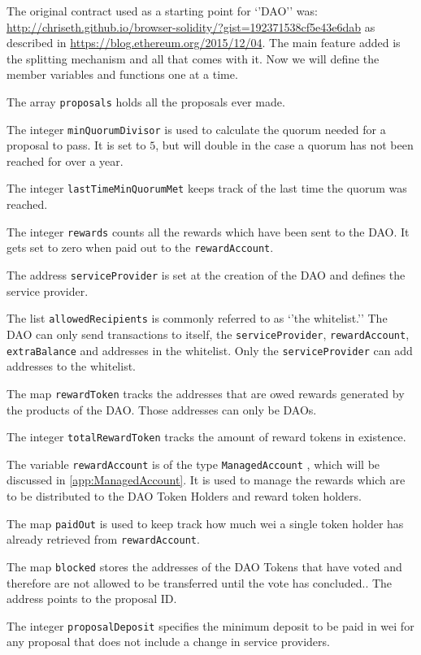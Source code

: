 \documentclass[9pt,oneside]{amsart}
\begin{document}
\begin{multicols}{2}
The original contract used as a starting point for ‘’DAO’’ was: \url{http://chriseth.github.io/browser-solidity/?gist=192371538cf5e43e6dab} as described in 
\url{https://blog.ethereum.org/2015/12/04}. The main feature added is the splitting mechanism and all that comes with it.
Now we will define the member variables and functions one at a time. 

The array \verb|proposals| holds all the proposals ever made. 

The integer \verb|minQuorumDivisor| is used to calculate the quorum needed for a proposal to pass. It is set to $5$, but will double in the case a quorum has not been reached for over a year.

The integer \verb|lastTimeMinQuorumMet| keeps track of the last time the quorum was reached.

The integer \verb|rewards| counts all the rewards which have been sent to the DAO. It gets set to zero when paid out to the \verb|rewardAccount|.

The address \verb|serviceProvider| is set at the creation of the DAO and defines the service provider. 

The list \verb|allowedRecipients| is commonly referred to as ‘’the whitelist.’’ The DAO can only send transactions to itself, the \verb|serviceProvider|, \verb|rewardAccount|, \verb|extraBalance| and addresses in the whitelist. Only the \verb|serviceProvider| can add addresses to the whitelist. 

The map \verb|rewardToken| tracks the addresses that are owed rewards generated by the products of the DAO. Those addresses can only be DAOs.

The integer \verb|totalRewardToken| tracks the amount of reward tokens in existence.

The variable \verb|rewardAccount| is of the type \verb|ManagedAccount| , which will be discussed in \ref{app:ManagedAccount}. It is used to manage the rewards which are to be distributed to the DAO Token Holders and reward token holders.

The map \verb|paidOut| is used to keep track how much wei a single token holder has already retrieved from \verb|rewardAccount|. 

The map \verb|blocked| stores the addresses of the DAO Tokens that have voted and therefore are not allowed to be transferred until the vote has concluded.. The address points to the proposal ID.

The integer \verb|proposalDeposit| specifies the minimum deposit to be paid in wei for any proposal that does not include a change in service providers.


\end{multicols}
\end{document}
